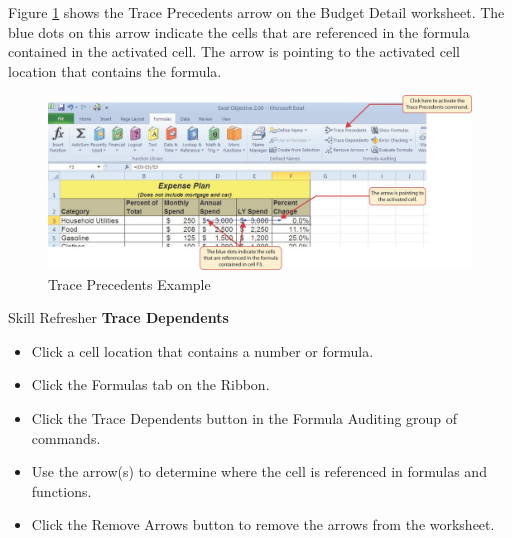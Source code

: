 Figure \ref{02:fig10} shows the Trace Precedents arrow on the Budget Detail worksheet. The blue dots on this arrow indicate the cells that are referenced in the formula contained in the activated cell. The arrow is pointing to the activated cell location that contains the formula.

\begin{figure}[H]
	\centering
	\includegraphics[width=\maxwidth{.95\linewidth}]{gfx/ch02_fig10}
	\caption{Trace Precedents Example}
	\label{02:fig10}
\end{figure}

\begin{center}
	\begin{sklbox}{Skill Refresher}
		\textbf{Trace Dependents}
		\\
		\begin{itemize}
			\setlength{\itemsep}{0pt}
			\setlength{\parskip}{0pt}
			\setlength{\parsep}{0pt}
			
			\item Click a cell location that contains a number or formula.
			\item Click the Formulas tab on the Ribbon.
			\item Click the Trace Dependents button in the Formula Auditing group of commands.
			\item Use the arrow(s) to determine where the cell is referenced in formulas and functions.
			\item Click the Remove Arrows button to remove the arrows from the worksheet.
			
		\end{itemize}
	\end{sklbox}
\end{center}

